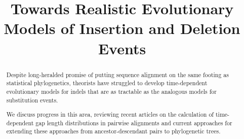 \documentclass{bmcart}
\begin{document}
\begin{frontmatter}

\begin{fmbox}

\title{Towards Realistic Evolutionary Models of Insertion and Deletion Events}

\author[
   addressref={aff1},                   %
   corref={aff1},                       %
   email={ihh@berkeley.edu}   %
]{ }

\address[id=aff1]{%
  , %
  ,                              %
}


\end{fmbox}%

\begin{abstractbox}

\begin{abstract} %
Despite long-heralded promise of putting sequence alignment on the same footing as statistical phylogenetics,
theorists have struggled to develop time-dependent evolutionary models for indels that are as tractable
as the analogous models for substitution events.

We discuss progress in this area,
reviewing recent articles on the calculation of time-dependent gap length distributions in pairwise alignments
and current approaches for extending these approaches from ancestor-descendant pairs to phylogenetic trees.
\end{abstract}

\begin{keyword}
\end{keyword}


\end{abstractbox}
%

\end{frontmatter}
\end{document}
